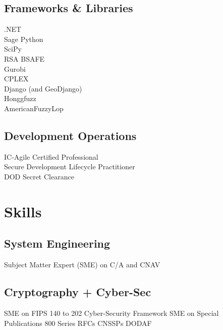 \documentclass[letterpaper]{clinton-resume}
\begin{document}
\begin{minipage}[t]{0.33\textwidth}
\sectionspace %

\subsection{Frameworks \& Libraries}
.NET\\
Sage Python\\
SciPy\\
RSA BSAFE\\
Gurobi\\
CPLEX\\
Django (and GeoDjango)\\
Honggfuzz\\
AmericanFuzzyLop\\
\sectionspace %
\subsection{Development Operations}
IC-Agile Certified Professional\\
Secure Development Lifecycle Practitioner\\
DOD Secret Clearance\\
\sectionspace %
\section{Skills}
\subsection{System Engineering}
Subject Matter Expert (SME) on C/A and CNAV
\subsection{Cryptography + Cyber-Sec}
SME on FIPS 140 to 202 \textbullet{} Cyber-Security Framework \textbullet{} SME on Special Publications 800 Series \textbullet{} RFCs \textbullet{} CNSSPs \textbullet{} DODAF\\
\end{minipage}
\end{document}
